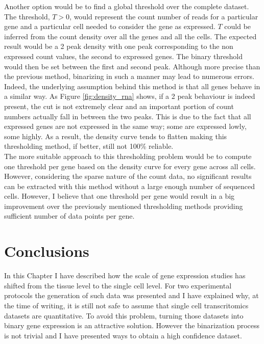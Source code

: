   Another option would be to find a global threshold over the complete dataset. The threshold, $T>0$, would represent the count number of reads for a particular gene and a particular cell needed to consider the gene as expressed. $T$ could be inferred from the count density over all the genes and all the cells. The expected result would be a 2 peak density with one peak corresponding to the non expressed count values, the second to expressed genes. The binary threshold would then be set between the first and second peak. Although more precise than the previous method, binarizing in such a manner may lead to numerous errors. Indeed, the underlying assumption behind this method is that all genes behave in a similar way. As Figure \ref{fig:density_rna} shows, if a 2 peak behaviour is indeed present, the cut is not extremely clear and an important portion of count numbers actually fall in between the two peaks. This is due to the fact that all expressed genes are not expressed in the same way; some are expressed lowly, some highly. As a result, the density curve tends to flatten making this thresholding method, if better, still not 100\% reliable.\\
  
  The more suitable approach to this thresholding problem would be to compute one threshold per gene based on the density curve for every gene across all cells. However, considering the sparse nature of the count data, no significant results can be extracted with this method without a large enough number of sequenced cells. However, I believe that one threshold per gene would result in a big improvement over the previously mentioned thresholding methods providing sufficient number of data points per gene.



\section{Conclusions}
In this Chapter I have described how the scale of gene expression studies has shifted from the tissue level to the single cell level. For two experimental protocols the generation of such data was presented and I have explained why, at the time of writing, it is still not safe to assume that single cell transcritomics datasets are quantitative. To avoid this problem, turning those datasets into binary gene expression is an attractive solution. However the binarization process is not trivial and I have presented ways to obtain a high confidence dataset.\\

